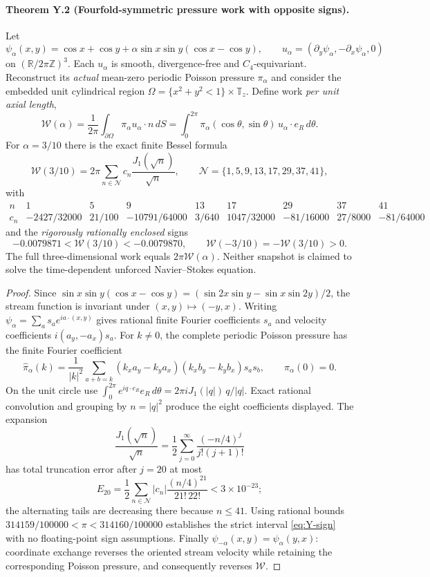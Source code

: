 \paragraph{Theorem Y.2 (Fourfold-symmetric pressure work with opposite signs).}
Let
\[
\psi_\alpha(x,y)=\cos x+\cos y+
\alpha\sin x\sin y(\cos x-\cos y),\qquad
u_\alpha=(\partial_y\psi_\alpha,-\partial_x\psi_\alpha,0)
\]
on $(\mathbb R/2\pi\mathbb Z)^3$. Each $u_\alpha$ is smooth, divergence-free and $C_4$-equivariant. Reconstruct its \emph{actual} mean-zero periodic Poisson pressure $\pi_\alpha$ and consider the embedded unit cylindrical region
$\Omega=\{x^2+y^2<1\}\times\mathbb T_z$. Define work \emph{per unit axial length},
\[
\mathcal W(\alpha)=\frac1{2\pi}
\int_{\partial\Omega}\pi_\alpha u_\alpha\cdot n\,dS
=\int_0^{2\pi}\pi_\alpha(\cos\theta,\sin\theta)\,
u_\alpha\cdot e_R\,d\theta.
\]
For $\alpha=3/10$ there is the exact finite Bessel formula
\begin{equation}\label{eq:Y-bessel}
\boxed{\mathcal W(3/10)=2\pi\sum_{n\in\mathcal N}c_n\frac{J_1(\sqrt n)}{\sqrt n},\qquad
\mathcal N=\{1,5,9,13,17,29,37,41\},}
\end{equation}
with
\[
\begin{array}{c|rrrrrrrr}
n&1&5&9&13&17&29&37&41\\ \hline
c_n&-2427/32000&21/100&-10791/64000&3/640&
1047/32000&-81/16000&27/8000&-81/64000
\end{array}
\]
and the \emph{rigorously rationally enclosed} signs
\begin{equation}\label{eq:Y-sign}
\boxed{-0.0079871<\mathcal W(3/10)<-0.0079870,\qquad
\mathcal W(-3/10)=-\mathcal W(3/10)>0.}
\end{equation}
The full three-dimensional work equals $2\pi\mathcal W(\alpha)$.
Neither snapshot is claimed to solve the time-dependent unforced Navier--Stokes equation.
\begin{proof}
Since
$\sin x\sin y(\cos x-\cos y)=
(\sin2x\sin y-\sin x\sin2y)/2$,
the stream function is invariant under $(x,y)\mapsto(-y,x)$.
Writing $\psi_\alpha=\sum_a s_a e^{ia\cdot(x,y)}$ gives rational finite Fourier coefficients $s_a$ and velocity coefficients $i(a_y,-a_x)s_a$. For $k\ne0$, the complete periodic Poisson pressure has the finite Fourier coefficient
\[
\widehat\pi_\alpha(k)
=\frac{1}{|k|^2}\sum_{a+b=k}
(k_xa_y-k_ya_x)(k_xb_y-k_yb_x)s_as_b,\qquad
\widehat\pi_\alpha(0)=0.
\]
On the unit circle use
$\int_0^{2\pi}e^{iq\cdot e_R}e_R\,d\theta
=2\pi iJ_1(|q|)\,q/|q|$.
Exact rational convolution and grouping by $n=|q|^2$ produce the eight coefficients displayed.
The expansion
\[
\frac{J_1(\sqrt n)}{\sqrt n}
=\frac12\sum_{j=0}^\infty\frac{(-n/4)^j}{j!(j+1)!}
\]
has total truncation error after $j=20$ at most
\[
E_{20}=\frac12\sum_{n\in\mathcal N}|c_n|
\frac{(n/4)^{21}}{21!\,22!}<3\times10^{-23};
\]
the alternating tails are decreasing there because $n\le41$.
Using rational bounds $314159/100000<\pi<314160/100000$ establishes the strict interval \eqref{eq:Y-sign} with no floating-point sign assumptions.
Finally $\psi_{-\alpha}(x,y)=\psi_\alpha(y,x)$:
coordinate exchange reverses the oriented stream velocity while retaining the corresponding Poisson pressure, and consequently reverses $\mathcal W$.
\end{proof}

